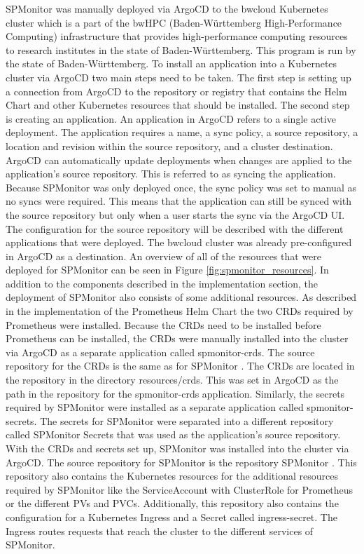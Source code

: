 SPMonitor was manually deployed via ArgoCD to the bwcloud Kubernetes cluster which is a part
of the bwHPC (Baden-Württemberg High-Performance Computing) infrastructure that provides high-performance computing resources to research
institutes in the state of Baden-Württemberg. This program is run by the state of Baden-Württemberg.
To install an application into a Kubernetes cluster via ArgoCD two main steps need to be taken.
The first step is setting up a connection from ArgoCD to the repository or registry that contains
the Helm Chart and other Kubernetes resources that should be installed.
The second step is creating an application. An application in ArgoCD refers to a single active deployment.
The application requires a name, a sync policy, a source repository, a location and revision within the source repository, and a cluster destination.
ArgoCD can automatically update deployments when changes are applied to the application's source repository.
This is referred to as syncing the application. Because SPMonitor was only deployed once,
the sync policy was set to manual as no syncs were required. This means that the application
can still be synced with the source repository but only when a user starts the sync via the ArgoCD UI.
The configuration for the source repository will be described with the different applications that were deployed.
The bwcloud cluster was already pre-configured in ArgoCD as a destination.
An overview of all of the resources that were deployed for SPMonitor can be seen in Figure \ref{fig:spmonitor_resources}.
In addition to the components described in the implementation section, the deployment of SPMonitor
also consists of some additional resources.
As described in the implementation of the Prometheus Helm Chart the two CRDs required
by Prometheus were installed. Because the CRDs need to be installed before Prometheus can be installed,
the CRDs were manually installed into the cluster via ArgoCD as a separate application called spmonitor-crds.
The source repository for the CRDs is the same as for SPMonitor \cite{CM-G-SP}. The CRDs
are located in the repository in the directory resources/crds. This was set in ArgoCD as the path
in the repository for the spmonitor-crds application.
Similarly, the secrets required by SPMonitor were installed as a separate application called spmonitor-secrets.
The secrets for SPMonitor were separated into a different repository called SPMonitor Secrets \cite{CM-G-SPS}
that was used as the application's source repository.
With the CRDs and secrets set up, SPMonitor was installed into the cluster via ArgoCD.
The source repository for SPMonitor is the repository SPMonitor \cite{CM-G-SP}.
This repository also contains the Kubernetes resources for the additional resources required by SPMonitor
like the ServiceAccount with ClusterRole for Prometheus or the different PVs and PVCs.
Additionally, this repository also contains the configuration for a Kubernetes Ingress
and a Secret called ingress-secret.
The Ingress routes requests that reach the cluster to the different services of SPMonitor.

